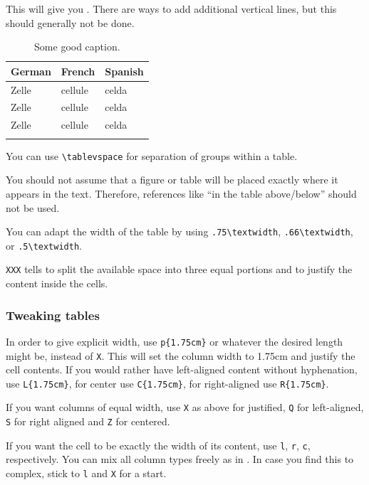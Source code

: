 This will give you  . There are ways to add additional vertical lines, but this should generally not be done. 

\begin{table}[h]
  \begin{tabularx}{\textwidth}{XXX}
    \lsptoprule
    German  & French  & Spanish \\
    \midrule
    Zelle   & cellule & celda    \\
    Zelle   & cellule & celda    \\
    Zelle   & cellule & celda    \\
    \lspbottomrule
  \end{tabularx}
  \caption{Some good caption.}
  \label{tab:chapterhandle:keytotable}
\end{table}

You can use \verb+\tablevspace+ for separation of groups within a table. 

You should not assume that a figure or table will be placed exactly where it appears in the text. Therefore, references like ``in the table above/below'' should not be used. 

You can adapt the width of the table by using \verb+.75\textwidth+,  \verb+.66\textwidth+, or \verb+.5\textwidth+.

\verb+XXX+ tells \latex to split the available space into three equal portions and to justify the content inside the cells. 

\subsubsection{Tweaking tables}
In order to give explicit width, use \verb+p{1.75cm}+ or whatever the desired length might be, instead of \verb+X+. 
This will set the column width to 1.75cm and justify the cell contents. If you would rather have left-aligned content without hyphenation, use \verb+L{1.75cm}+, for center use \verb+C{1.75cm}+, for right-aligned use \verb+R{1.75cm}+.

If you want columns of equal width, use \verb+X+ as above for justified, \verb+Q+ for left-aligned, \verb+S+ for right aligned and \verb+Z+ for centered.

If you want the cell to be exactly the width of its content, use \verb+l+, \verb+r+, \verb+c+, respectively. You can mix all column types freely as in . In case you find this to complex, stick to \verb+l+ and \verb+X+ for a start.

